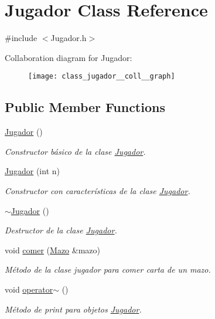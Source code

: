 \hypertarget{class_jugador}{\section{Jugador Class Reference}
\label{class_jugador}
}


{\ttfamily \#include $<$Jugador.\+h$>$}



Collaboration diagram for Jugador\+:
\nopagebreak
\begin{figure}[H]
\begin{center}
\leavevmode
\texttt{[image: class\_jugador\_\_coll\_\_graph]}
\end{center}
\end{figure}
\subsection*{Public Member Functions}
\begin{DoxyCompactItemize}
\item 
\hyperlink{class_jugador_a232c46f75691af6210096e5972535d71}{Jugador} ()
\begin{DoxyCompactList}\small\item\em Constructor básico de la clase \hyperlink{class_jugador}{Jugador}. \end{DoxyCompactList}\item 
\hyperlink{class_jugador_a7a2ed7131d027122be6eb89baf919bc9}{Jugador} (int n)
\begin{DoxyCompactList}\small\item\em Constructor con características de la clase \hyperlink{class_jugador}{Jugador}. \end{DoxyCompactList}\item 
\hyperlink{class_jugador_a9db1d422fe3b675f92d9fd687b1f42c4}{$\sim$\+Jugador} ()
\begin{DoxyCompactList}\small\item\em Destructor de la clase \hyperlink{class_jugador}{Jugador}. \end{DoxyCompactList}\item 
void \hyperlink{class_jugador_a08b73142c7216db984dede56ccb15d1a}{comer} (\hyperlink{class_mazo}{Mazo} \&mazo)
\begin{DoxyCompactList}\small\item\em Método de la clase jugador para comer carta de un mazo. \end{DoxyCompactList}\item 
void \hyperlink{class_jugador_a74982f759e1f8fcbbd9b8182f03665df}{operator$\sim$} ()
\begin{DoxyCompactList}\small\item\em Método de print para objetos \hyperlink{class_jugador}{Jugador}. \end{DoxyCompactList}\end{DoxyCompactItemize}
